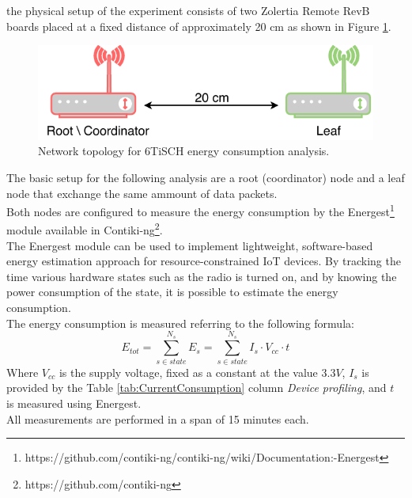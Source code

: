 \documentclass[conference]{IEEEtran}
\begin{document}
the physical setup of the experiment consists of two Zolertia  Remote RevB boards placed at a fixed distance of approximately 20 cm as shown in Figure \ref{fig:exp1Topology}.
\begin{figure}[H]
	\centering
	\includegraphics[width=.35\textwidth,keepaspectratio]{exp1Topology.pdf}
	\caption{Network topology for 6TiSCH energy consumption analysis.}
	\label{fig:exp1Topology}
\end{figure}
The basic setup for the following analysis are a root (coordinator) node and a leaf node that exchange the same ammount of data packets.\\
Both nodes are configured to measure the energy consumption by the Energest\footnote{https://github.com/contiki-ng/contiki-ng/wiki/Documentation:-Energest} module available in Contiki-ng\footnote{https://github.com/contiki-ng}.\\
The Energest module can be used to implement lightweight, software-based energy estimation approach for resource-constrained IoT devices. By tracking the time various hardware states such as the radio is turned on, and by knowing the power consumption of the state, it is possible to estimate the energy consumption\cite{contiki-NGWiki}.\\
The energy consumption is measured referring to the following formula:
\begin{equation}
	E_{tot}=\sum_{s \in state}^{N_{s}}E_{s}=\sum_{s \in state}^{N_{s}}I_s  \cdot V_{cc} \cdot t
\end{equation}
Where $V_{cc}$ is the supply voltage, fixed as a constant at the value $3.3V$, $I_s$ is provided by the Table \ref{tab:CurrentConsumption} column \textit{Device profiling}\cite{EnergyConsumption}, and $t$ is measured using Energest.\\
All measurements are performed in a span of 15 minutes each.
\end{document}
